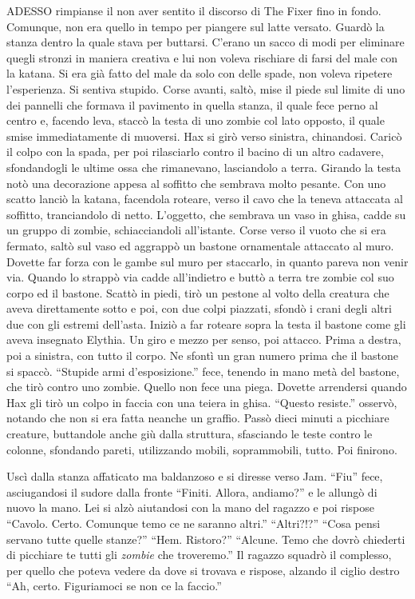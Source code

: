     ADESSO rimpianse il non aver sentito il discorso di The Fixer fino in
    fondo. Comunque, non era quello in tempo per piangere sul latte
    versato. Guardò la stanza dentro la quale stava per buttarsi. C'erano
    un sacco di modi per eliminare quegli stronzi in maniera creativa e lui
    non voleva rischiare di farsi del male con la katana. Si era già fatto
    del male da solo con delle spade, non voleva ripetere l'esperienza. Si
    sentiva stupido. Corse avanti, saltò, mise il piede sul limite di uno dei pannelli
    che formava il pavimento in quella stanza, il quale fece perno al
    centro e, facendo leva, staccò la testa di uno zombie col lato opposto,
    il quale smise immediatamente di muoversi.
    Hax si girò verso sinistra, chinandosi. Caricò il colpo con la spada,
    per poi rilasciarlo contro il bacino di un altro cadavere, sfondandogli
    le ultime ossa che rimanevano, lasciandolo a terra. Girando la testa
    notò una decorazione appesa al soffitto che sembrava molto pesante. Con
    uno scatto lanciò la katana, facendola roteare, verso il cavo che la
    teneva attaccata al soffitto, tranciandolo di netto. L'oggetto, che
    sembrava un vaso in ghisa, cadde su un gruppo di zombie, schiacciandoli
    all'istante. Corse verso il vuoto che si era fermato, saltò sul vaso ed
    aggrappò un bastone ornamentale attaccato al muro. Dovette far forza
    con le gambe sul muro per staccarlo, in quanto pareva non venir via.
    Quando lo strappò via cadde all'indietro e buttò a terra tre zombie col
    suo corpo ed il bastone. Scattò in piedi, tirò un pestone al volto
    della creatura che aveva direttamente sotto e poi, con due colpi
    piazzati, sfondò i crani degli altri due con gli estremi dell'asta.
    Iniziò a far roteare sopra la testa il bastone come gli aveva insegnato
    Elythia. Un giro e mezzo per senso, poi attacco. Prima a destra, poi a
    sinistra, con tutto il corpo. Ne sfontì un gran numero prima che il
    bastone si spaccò. ``Stupide armi d'esposizione.'' fece, tenendo in
    mano metà del bastone, che tirò contro uno zombie. Quello non fece una
    piega. Dovette arrendersi quando Hax gli tirò un colpo in faccia con
    una teiera in ghisa. ``Questo resiste.'' osservò, notando che non si
    era fatta neanche un graffio. Passò dieci minuti a picchiare creature,
    buttandole anche giù dalla struttura, sfasciando le teste contro le
    colonne, sfondando pareti, utilizzando mobili, soprammobili, tutto. Poi
    finirono.

    Uscì dalla stanza affaticato ma baldanzoso e si diresse verso Jam.
    ``Fiu'' fece, asciugandosi il sudore dalla fronte ``Finiti. Allora,
    andiamo?'' e le allungò di nuovo la mano. Lei si alzò aiutandosi con la
    mano del ragazzo e poi rispose ``Cavolo. Certo. Comunque temo ce ne
    saranno altri.'' ``Altri?!?'' ``Cosa pensi servano tutte quelle
    stanze?'' ``Hem. Ristoro?'' ``Alcune. Temo che dovrò chiederti di
    picchiare te tutti gli \emph{zombie} che troveremo.'' Il ragazzo
    squadrò il complesso, per quello che poteva vedere da dove si trovava e
    rispose, alzando il ciglio destro ``Ah, certo. Figuriamoci se non ce la
    faccio.''

